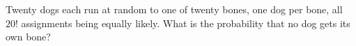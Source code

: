 Twenty dogs each run at random to one of twenty bones, one dog per bone, all $20!$ assignments being equally likely. What is the probability that no dog gets its own bone?
